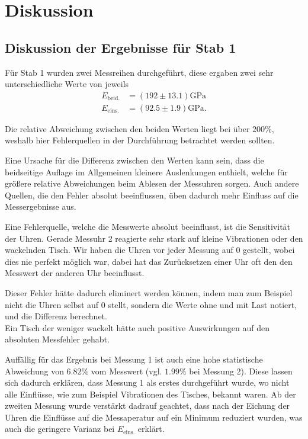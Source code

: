 \section{Diskussion}
\label{sec:Diskussion}

\subsection{Diskussion der Ergebnisse für Stab 1}
\label{sec:diskussion-stab1}

Für Stab 1 wurden zwei Messreihen durchgeführt, diese ergaben zwei sehr 
unterschiedliche Werte von jeweils
\begin{align}
	E_\text{beid.} &= (192 \pm 13.1) \si{\giga\pascal} \\
	E_\text{eins.} &= (92.5 \pm 1.9) \si{\giga\pascal}.
\end{align}

Die relative Abweichung zwischen den beiden Werten liegt bei über $200\%$,
weshalb hier Fehlerquellen in der Durchführung betrachtet werden sollten.

Eine Ursache für die Differenz zwischen den Werten kann sein, dass die 
beidseitige
Auflage im Allgemeinen kleinere Auslenkungen enthielt, welche für größere 
relative
Abweichungen beim Ablesen der Messuhren sorgen. Auch andere Quellen, die den
Fehler absolut beeinflussen, üben dadurch mehr Einfluss auf die Messergebnisse
aus.

Eine Fehlerquelle, welche die Messwerte absolut beeinflusst, ist die 
Sensitivität der Uhren. Gerade Messuhr 2 reagierte sehr stark auf kleine Vibrationen 
oder den wackelnden Tisch. Wir haben die Uhren vor jeder Messung auf 0 gestellt,
wobei dies nie perfekt möglich war, dabei hat das Zurücksetzen einer Uhr oft den 
den Messwert der anderen Uhr beeinflusst.

Dieser Fehler hätte dadurch eliminert werden können, indem man zum Beispiel nicht 
die Uhren selbst auf 0 stellt, sondern die Werte ohne und mit Last notiert, und
die Differenz berechnet.
\\
Ein Tisch der weniger wackelt hätte auch positive Auswirkungen auf den absoluten
Messfehler gehabt.

Auffällig für das Ergebnis bei Messung 1 ist auch eine hohe statistische 
Abweichung von $6.82\%$ vom Messwert (vgl. $1.99\%$ bei Messung 2). Diese lassen sich dadurch
erklären, dass Messung 1 als erstes durchgeführt wurde, wo nicht alle Einflüsse, wie zum Beispiel 
Vibrationen des Tisches, bekannt waren. Ab der zweiten Messung wurde verstärkt dadrauf geachtet, 
dass nach der Eichung der Uhren die Einflüsse auf die Messaperatur auf ein Minimum reduziert wurden,
was auch die geringere Varianz bei $E_\text{eins.}$ erklärt.

